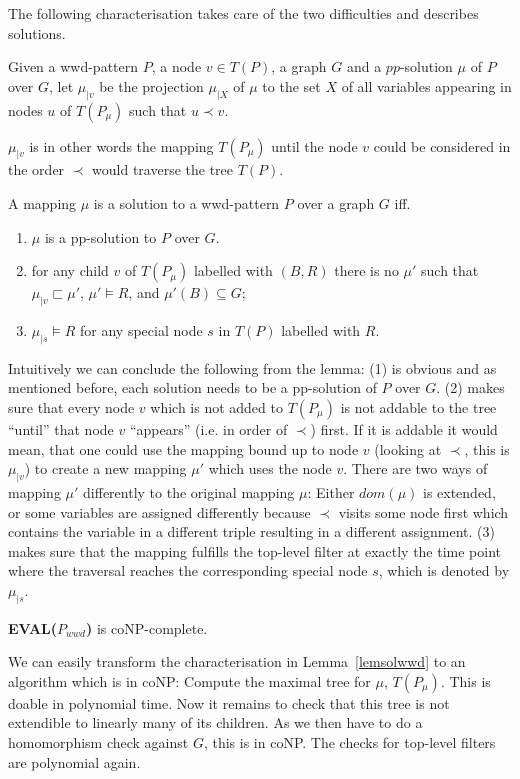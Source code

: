 The following characterisation takes care of the two difficulties and describes
solutions.
\begin{definition}
	Given a wwd-pattern $P$, a node $v \in T(P)$, a graph $G$ and a
	$pp$-solution $\mu$ of $P$ over $G$, let $\mu_{|v}$ be the projection
	$\mu_{|X}$ of $\mu$ to the set $X$ of all variables appearing in nodes $u$
	of $T(P_\mu)$ such that $u \prec v$.
\end{definition}
$\mu_{|v}$ is in other words the mapping $T(P_\mu)$ until the node $v$ could be
considered in the order $\prec$ would traverse the tree $T(P)$.
\begin{lemma}\label{lemsolwwd}
	A mapping $\mu$ is a solution to a wwd-pattern $P$ over a graph $G$ iff. 
	\begin{enumerate}
		\item $\mu$ is a pp-solution to $P$ over $G$.
		\item for any child $v$ of $T(P_\mu)$ labelled with $(B,R)$ there is no
			$\mu'$ such that $\mu_{|v} \sqsubset \mu'$, $\mu' \models R$, and
			$\mu'(B) \subseteq G$;
		\item $\mu_{|s} \models R$ for any special node $s$ in $T(P)$ labelled
			with $R$.
	\end{enumerate}
\end{lemma}
Intuitively we can conclude the following from the lemma: (1) is obvious and as
mentioned before, each solution needs to be a pp-solution of $P$ over $G$.
(2) makes sure that every node $v$ which is not added to $T(P_\mu)$ is not addable
to the tree ``until'' that node $v$ ``appears'' (i.e. in order of $\prec$) first. 
If it is addable it would mean,
that one could use the mapping bound up to node $v$ (looking at $\prec$, this is
$\mu_{|v}$) to create a new mapping
$\mu'$ which uses the node $v$. There are two ways of mapping $\mu'$
differently to the original mapping $\mu$: Either $dom(\mu)$ is extended, or
some variables are assigned differently because $\prec$ visits some node first
which contains the variable in a different triple resulting in a different
assignment.
(3) makes sure that the mapping fulfills the top-level filter at exactly the
time point where the traversal reaches the corresponding special node $s$, which
is denoted by $\mu_{|s}$.

\begin{theorem}
	\textbf{EVAL($P_{wwd}$)} is coNP-complete.
\end{theorem}
\begin{proofidea}
	We can easily transform the characterisation in
	Lemma~\ref{lemsolwwd} to an	algorithm which is in coNP: 
	Compute the maximal tree for $\mu$, $T(P_\mu)$. This is doable in polynomial
	time. Now it remains to check that this tree is not extendible to linearly
	many of its children. As we then have to do a homomorphism check against
	$G$, this is in coNP. The checks for top-level filters are polynomial again.
\end{proofidea}

